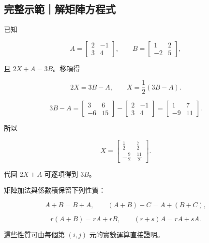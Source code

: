 \documentclass[11pt,a4paper]{article}
\begin{document}
\begin{HandoutWorkedExample}

\subsection{完整示範｜解矩陣方程式}\label{ux5b8cux6574ux793aux7bc4ux89e3ux77e9ux9663ux65b9ux7a0bux5f0f}

已知

\[
A=
\begin{bmatrix}
2&-1\\
3&4
\end{bmatrix},\qquad
B=
\begin{bmatrix}
1&2\\
-2&5
\end{bmatrix},
\]

且 \(2X+A=3B\)。移項得

\[
2X=3B-A,\qquad X=\frac12(3B-A).
\]

\[
3B-A
=
\begin{bmatrix}
3&6\\
-6&15
\end{bmatrix}
-
\begin{bmatrix}
2&-1\\
3&4
\end{bmatrix}
=
\begin{bmatrix}
1&7\\
-9&11
\end{bmatrix}.
\]

所以

\[
\boxed{
X=
\begin{bmatrix}
\tfrac12&\tfrac72\\
-\tfrac92&\tfrac{11}{2}
\end{bmatrix}}.
\]

代回 \(2X+A\) 可逐項得到 \(3B\)。

\end{HandoutWorkedExample}

矩陣加法與係數積保留下列性質：

\[
A+B=B+A,\qquad (A+B)+C=A+(B+C),
\]

\[
r(A+B)=rA+rB,\qquad (r+s)A=rA+sA.
\]

這些性質可由每個第 \((i,j)\) 元的實數運算直接證明。
\end{document}
